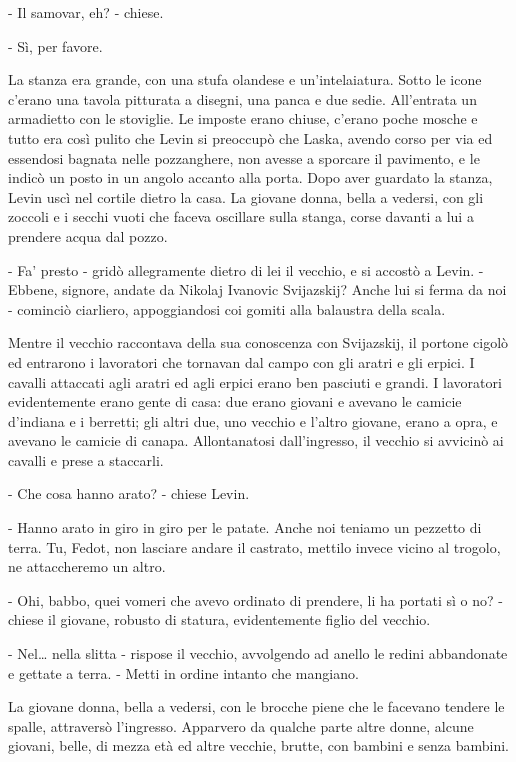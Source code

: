 - Il samovar, eh? - chiese. 

- Sì, per favore. 

La stanza era grande, con una stufa olandese e un'intelaiatura. Sotto le icone c'erano una tavola pitturata a disegni, una panca e due sedie. All'entrata un armadietto con le stoviglie. Le imposte erano chiuse, c'erano poche mosche e tutto era così pulito che Levin si preoccupò che Laska, avendo corso per via ed essendosi bagnata nelle pozzanghere, non avesse a sporcare il pavimento, e le indicò un posto in un angolo accanto alla porta. Dopo aver guardato la stanza, Levin uscì nel cortile dietro la casa. La giovane donna, bella a vedersi, con gli zoccoli e i secchi vuoti che faceva oscillare sulla stanga, corse davanti a lui a prendere acqua dal pozzo. 

- Fa' presto - gridò allegramente dietro di lei il vecchio, e si accostò a Levin. - Ebbene, signore, andate da Nikolaj Ivanovic Svijazskij? Anche lui si ferma da noi - cominciò ciarliero, appoggiandosi coi gomiti alla balaustra della scala. 

Mentre il vecchio raccontava della sua conoscenza con Svijazskij, il portone cigolò ed entrarono i lavoratori che tornavan dal campo con gli aratri e gli erpici. I cavalli attaccati agli aratri ed agli erpici erano ben pasciuti e grandi. I lavoratori evidentemente erano gente di casa: due erano giovani e avevano le camicie d'indiana e i berretti; gli altri due, uno vecchio e l'altro giovane, erano a opra, e avevano le camicie di canapa. Allontanatosi dall'ingresso, il vecchio si avvicinò ai cavalli e prese a staccarli. 

- Che cosa hanno arato? - chiese Levin. 

- Hanno arato in giro in giro per le patate. Anche noi teniamo un pezzetto di terra. Tu, Fedot, non lasciare andare il castrato, mettilo invece vicino al trogolo, ne attaccheremo un altro. 

- Ohi, babbo, quei vomeri che avevo ordinato di prendere, li ha portati sì o no? - chiese il giovane, robusto di statura, evidentemente figlio del vecchio. 

- Nel\ldots{} nella slitta - rispose il vecchio, avvolgendo ad anello le redini abbandonate e gettate a terra. - Metti in ordine intanto che mangiano. 

La giovane donna, bella a vedersi, con le brocche piene che le facevano tendere le spalle, attraversò l'ingresso. Apparvero da qualche parte altre donne, alcune giovani, belle, di mezza età ed altre vecchie, brutte, con bambini e senza bambini. 

